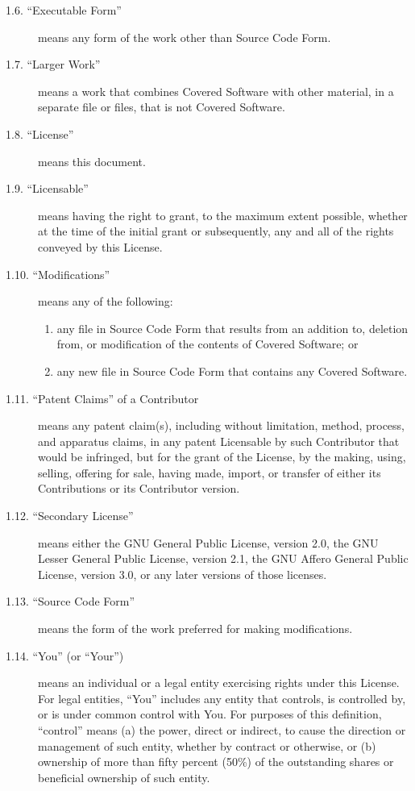 \documentclass[letterpaper,10pt,openany,oneside,english]{sphinxmanual}
\begin{document}
\begin{description}
\item[{1.6. “Executable Form”}] \leavevmode
means any form of the work other than Source Code Form.

\item[{1.7. “Larger Work”}] \leavevmode
means a work that combines Covered Software with other material, in
a separate file or files, that is not Covered Software.

\item[{1.8. “License”}] \leavevmode
means this document.

\item[{1.9. “Licensable”}] \leavevmode
means having the right to grant, to the maximum extent possible,
whether at the time of the initial grant or subsequently, any and
all of the rights conveyed by this License.

\item[{1.10. “Modifications”}] \leavevmode
means any of the following:
\begin{enumerate}
\item {} 
any file in Source Code Form that results from an addition to,
deletion from, or modification of the contents of Covered
Software; or

\item {} 
any new file in Source Code Form that contains any Covered
Software.

\end{enumerate}

\item[{1.11. “Patent Claims” of a Contributor}] \leavevmode
means any patent claim(s), including without limitation, method,
process, and apparatus claims, in any patent Licensable by such
Contributor that would be infringed, but for the grant of the
License, by the making, using, selling, offering for sale, having
made, import, or transfer of either its Contributions or its
Contributor version.

\item[{1.12. “Secondary License”}] \leavevmode
means either the GNU General Public License, version 2.0, the GNU
Lesser General Public License, version 2.1, the GNU Affero General
Public License, version 3.0, or any later versions of those
licenses.

\item[{1.13. “Source Code Form”}] \leavevmode
means the form of the work preferred for making modifications.

\item[{1.14. “You” (or “Your”)}] \leavevmode
means an individual or a legal entity exercising rights under this
License. For legal entities, “You” includes any entity that
controls, is controlled by, or is under common control with You. For
purposes of this definition, “control” means (a) the power, direct
or indirect, to cause the direction or management of such entity,
whether by contract or otherwise, or (b) ownership of more than
fifty percent (50\%) of the outstanding shares or beneficial
ownership of such entity.

\end{description}
\end{document}
